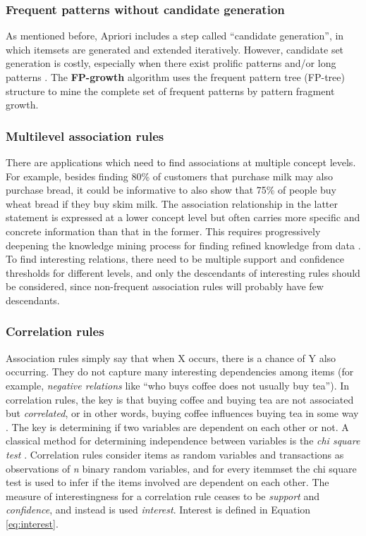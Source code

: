 \subsubsection*{Frequent patterns without candidate generation} 
As mentioned before, Apriori includes a step called “candidate generation”, in which itemsets are generated and extended iteratively.  However, candidate set generation is costly, especially when there exist prolific patterns and/or long patterns \cite{han2004mining}. The \textbf{FP-growth} algorithm \cite{han2004mining} uses the frequent pattern tree (FP-tree) structure to mine the complete set of frequent patterns by pattern fragment growth. 

\subsubsection*{Multilevel association rules}
There are applications which need to find associations at multiple concept levels. For example, besides finding 80\% of customers that purchase milk may also purchase bread, it could be informative to also show that 75\% of people buy wheat bread if they buy skim milk. The association relationship in the latter statement is expressed at a lower concept level but often carries more specific and concrete information than that in the former. This requires progressively deepening the knowledge mining process for finding refined knowledge from data \cite{han1999mining}. To find interesting relations, there need to be multiple support and confidence thresholds for different levels, and only the descendants of interesting rules should be considered, since non-frequent association rules will probably have few descendants.

\subsubsection*{Correlation rules}
Association rules simply say that when X occurs, there is a chance of Y also occurring. They do not capture many interesting dependencies among items (for example, \textit{negative relations} like “who buys coffee does not usually buy tea”). In correlation rules, the key is that buying coffee and buying tea are not 
associated but \textit{correlated}, or in other words, buying coffee influences buying tea in some way \cite{brin1997beyond}. The key is determining if two variables are dependent on each other or not. A classical method for determining independence between variables is the \textit{chi square test} \cite{lancaster1969chi}. Correlation rules consider items as random variables and transactions as observations of \textit{n} binary random variables, and for every itemmset the chi square test is used to infer if the items involved are dependent on each other. The measure of interestingness for a correlation rule ceases to be \textit{support} and \textit{confidence}, and instead is used \textit{interest}. Interest is defined in Equation \ref{eq:interest}.

